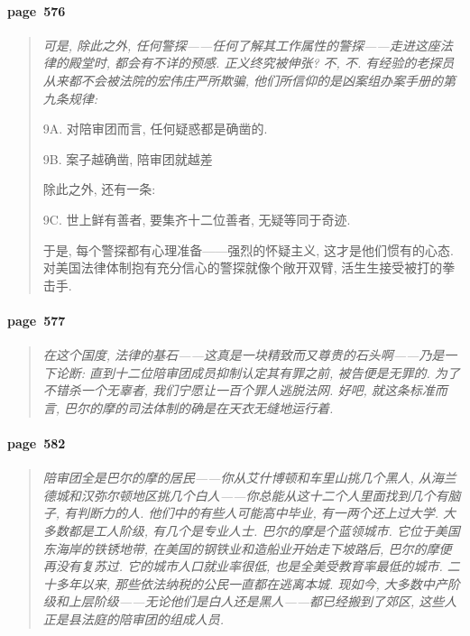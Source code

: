 \paragraph*{page~576}
\begin{quotation}
    \itshape
    可是, 除此之外, 任何警探------任何了解其工作属性的警探------走进这座法律的殿堂时, 都会有不详的预感. 正义终究被伸张? 不, 不. 有经验的老探员从来都不会被法院的宏伟庄严所欺骗, 他们所信仰的是凶案组办案手册的第九条规律:
    
    9A. 对陪审团而言, 任何疑惑都是确凿的.

    9B. 案子越确凿, 陪审团就越差

    除此之外, 还有一条:

    9C. 世上鲜有善者, 要集齐十二位善者, 无疑等同于奇迹.

    于是, 每个警探都有心理准备------强烈的怀疑主义, 这才是他们惯有的心态. 对美国法律体制抱有充分信心的警探就像个敞开双臂, 活生生接受被打的拳击手. 
\end{quotation}

\paragraph*{page~577}
\begin{quotation}
    \itshape
    在这个国度, 法律的基石------这真是一块精致而又尊贵的石头啊------乃是一下论断: 直到十二位陪审团成员抑制认定其有罪之前, 被告便是无罪的. 为了不错杀一个无辜者, 我们宁愿让一百个罪人逃脱法网. 好吧, 就这条标准而言, 巴尔的摩的司法体制的确是在天衣无缝地运行着.
\end{quotation}

\paragraph*{page~582}
\begin{quotation}
    \itshape
    陪审团全是巴尔的摩的居民------你从艾什博顿和车里山挑几个黑人, 从海兰德城和汉弥尔顿地区挑几个白人------你总能从这十二个人里面找到几个有脑子, 有判断力的人. 他们中的有些人可能高中毕业, 有一两个还上过大学. 大多数都是工人阶级, 有几个是专业人士. 巴尔的摩是个蓝领城市. 它位于美国东海岸的铁锈地带, 在美国的钢铁业和造船业开始走下坡路后, 巴尔的摩便再没有复苏过. 它的城市人口就业率很低, 也是全美受教育率最低的城市. 二十多年以来, 那些依法纳税的公民一直都在逃离本城. 现如今, 大多数中产阶级和上层阶级------无论他们是白人还是黑人------都已经搬到了郊区, 这些人正是县法庭的陪审团的组成人员. 
\end{quotation}

